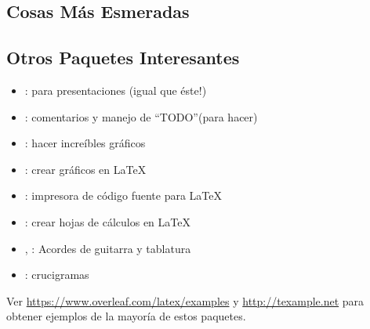 \documentclass{beamer}
\begin{document}
\subsection{Cosas Más Esmeradas}
\begin{frame}[fragile]{\insertsubsection}
\end{frame}

\subsection{Otros Paquetes Interesantes}
\begin{frame}{\insertsubsection}
  \begin{itemize}
  \item {}: para presentaciones (igual que éste!)
  \item {}: comentarios y manejo de ``TODO''(para hacer)
  \item {}: hacer increíbles gráficos
  \item {}: crear gráficos en \LaTeX
  \item {}: impresora de código fuente para \LaTeX
  \item {}: crear hojas de cálculos en \LaTeX
  \item {}, : Acordes de guitarra y tablatura
  \item {}: crucigramas
  \end{itemize}
  Ver \url{https://www.overleaf.com/latex/examples} y \url{http://texample.net}
  para obtener ejemplos de la mayoría de estos paquetes.
\end{frame}
\end{document}
